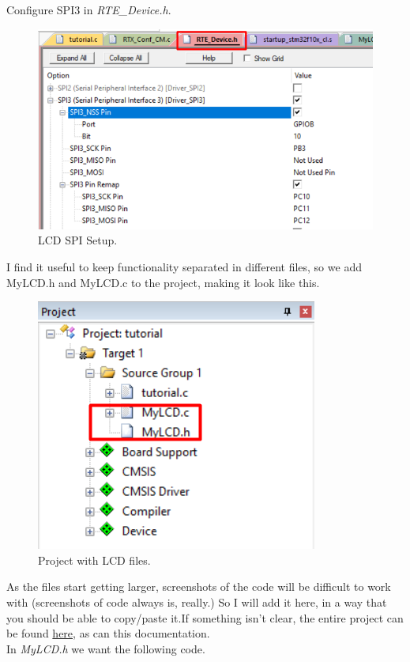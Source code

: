 \documentclass{article}
\begin{document}
Configure SPI3 in \textit{RTE\_Device.h}.
\begin{figure}[H]
    \centering
    \includegraphics[width=0.8\linewidth]{pics/LCDSPISetup.png}
    \caption{LCD SPI Setup.}
    \label{fig:LCDSPISetup}
\end{figure}

\newpage

I find it useful to keep functionality separated in different files, so
we add MyLCD.h and MyLCD.c to the project, making it look like this.
\begin{figure}[H]
    \centering
    \includegraphics[width=0.4\linewidth]{pics/LCDProject.png}
    \caption{Project with LCD files.}
    \label{fig:LCDProject}
\end{figure}

As the files start getting larger, screenshots of the code will be difficult to work with
(screenshots of code always is, really.) So I will add it here, in a way that you should
be able to copy/paste it.If something isn't clear, the entire project can be found
\href{https://github.com/ClausHolmgaard/MCBSTM32C_Tutorial}{here}, as can this documentation.\\
In \textit{MyLCD.h} we want the following code.
\end{document}
